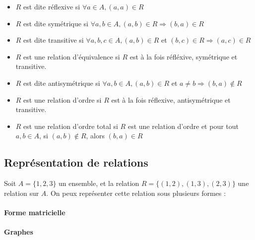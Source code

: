 \documentclass[12pt, a4paper]{report}
\begin{document}
\begin{itemize}
\item $R$ est dite réflexive si $\forall a\in A, (a,a)\in R$

\item $R$ est dite symétrique si $\forall a, b\in A, (a,b)\in R
  \Rightarrow (b,a)\in R$

\item $R$ est dite transitive si $\forall a, b, c\in A, (a,b)\in R$ et
  $(b,c)\in R \Rightarrow (a,c)\in R$

\item $R$ est une relation d'équivalence si $R$ est à la fois
  réfléxive, symétrique et transitive.

\item $R$ est dite antisymétrique si $\forall a, b\in A, (a,b)\in R$
  et $a\neq b \Rightarrow (b,a)\not\in R$
\item $R$ est une relation d'ordre si $R$ est à la fois réflexive,
antisymétrique et transitive.
\item $R$ est une relation d'ordre total si $R$ est une relation d'ordre et pour
tout $a, b\in A$, si $(a,b) \not\in R$, alors $(b,a)\in R$
\end{itemize}

\subsection{Représentation de relations}

Soit $A = \{1,2,3\}$ un ensemble, et la relation $R = \{(1,2),(1,3),(2,3)\}$
une relation sur $A$. On peux représenter cette relation sous plusieurs formes :

\paragraph{Forme matricielle}

\paragraph{Graphes}
 
\end{document}

